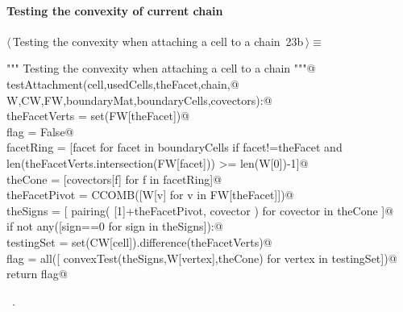 \documentclass[11pt,oneside]{article}	%
\begin{document}
\paragraph{Testing the convexity of current chain}
\begin{flushleft} \small \label{scrap29}
\protect{}$\langle\,$Testing the convexity when attaching a cell to a chain\nobreak\ {\footnotesize 23b}$\,\rangle\equiv$
\vspace{-1ex}
\begin{list}{}{} \item
\mbox{}\verb@""" Testing the convexity when attaching a cell to a chain """@\\
\mbox{}\verb@def testAttachment(cell,usedCells,theFacet,chain,@\\
\mbox{}\verb@               W,CW,FW,boundaryMat,boundaryCells,covectors):@\\
\mbox{}\verb@   theFacetVerts = set(FW[theFacet])@\\
\mbox{}\verb@   flag = False@\\
\mbox{}\verb@   facetRing = [facet for facet in boundaryCells if facet!=theFacet and \@\\
\mbox{}\verb@             len(theFacetVerts.intersection(FW[facet])) >= len(W[0])-1]@\\
\mbox{}\verb@   theCone = [covectors[f] for f in facetRing]@\\
\mbox{}\verb@   theFacetPivot = CCOMB([W[v] for v in FW[theFacet]])@\\
\mbox{}\verb@   theSigns = [ pairing( [1]+theFacetPivot, covector ) for covector in theCone ]@\\
\mbox{}\verb@   if not any([sign==0 for sign in theSigns]):@\\
\mbox{}\verb@      testingSet = set(CW[cell]).difference(theFacetVerts)@\\
\mbox{}\verb@      flag = all([ convexTest(theSigns,W[vertex],theCone) for vertex in testingSet])@\\
\mbox{}\verb@   return flag@\\
\mbox{}\verb@@{\NWsep}
\end{list}
\vspace{-1ex}
\footnotesize\addtolength{\baselineskip}{-1ex}
\begin{list}{}{\setlength{\itemsep}{-\parsep}\setlength{\itemindent}{-\leftmargin}}
\item \NWtxtMacroRefIn\ .
\end{list}
\end{flushleft}
\end{document}
